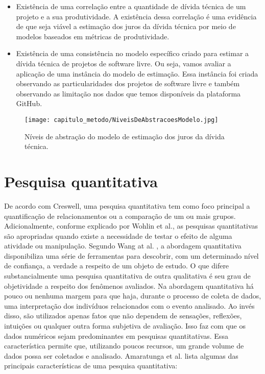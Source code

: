 \begin{itemize}
\item Existência de uma correlação entre a quantidade de dívida técnica de um projeto e a sua produtividade.  A existência dessa correlação é uma evidência de que seja viável a estimação dos juros da dívida técnica por meio de modelos baseados em métricas de produtividade. 
\item Existência de uma consistência no modelo específico criado para estimar a dívida técnica de projetos de software livre. Ou seja, vamos avaliar a aplicação de uma instância do modelo de estimação. Essa instância foi criada observando as particularidades dos projetos de software livre e também observando as limitação nos dados que temos disponíveis da plataforma GitHub.
\end{itemize} 



  \begin{figure}[H]
  \centering
  \texttt{[image: capitulo\_metodo/NiveisDeAbstracoesModelo.jpg]} 
  \caption{Níveis de abstração do modelo de estimação dos juros da dívida técnica. }
  \label{fig:cap_metodo_niveis_abstracao} 
\end{figure}




\section{Pesquisa quantitativa}




De acordo com Creswell\cite{w2016research}, uma pesquisa quantitativa tem como foco principal a quantificação de relacionamentos ou a comparação de um ou mais grupos. Adicionalmente, conforme explicado por Wohlin et al.\cite{wohlin2003empirical}, as pesquisas quantitativas são apropriadas quando existe a necessidade de testar o efeito de alguma atividade ou manipulação. Segundo Wang at al. \cite{wang201331}, a abordagem quantitativa disponibiliza uma série de ferramentas para descobrir, com um determinado nível de confiança, a verdade a respeito de um objeto de estudo. O que difere substancialmente uma pesquisa quantitativa de outra qualitativa é seu grau de  objetividade a respeito dos fenômenos avaliados. Na abordagem quantitativa há pouco ou nenhuma margem para que haja, durante o processo de coleta de dados, uma interpretação dos indivíduos relacionados com o evento analisado. Ao invés disso, são utilizados apenas fatos que não dependem de sensações, reflexões, intuições ou qualquer outra forma subjetiva de avaliação. Isso faz com que os dados numéricos sejam predominantes em pesquisas quantitativas.  Essa característica permite que, utilizando poucos recursos, um grande volume de dados possa ser coletados e analisado.  Amaratunga et al. \cite{amaratunga2002quantitative} lista algumas das principais características de uma pesquisa quantitativa:

